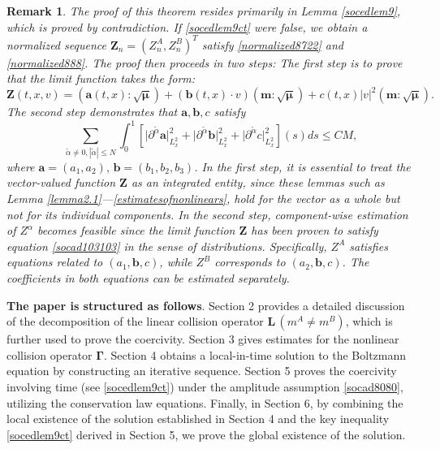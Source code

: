 \documentclass[reqno]{amsart}
\numberwithin{equation}{section}
\newtheorem{remark}[theorem]{Remark}
\numberwithin{equation}{section}
\begin{document}
\begin{remark}
	‌The proof of this theorem resides primarily in Lemma \ref{socedlem9}, which is proved by contradiction. If \eqref{socedlem9ct} were false, we obtain a  normalized sequence $\mathbf{Z}_n=(Z^A_n,Z^B_n)^T$ satisfy \eqref{normalized8722} and \eqref{normalized888}. ‌The proof then proceeds in two steps:
	‌The first step is to prove that the limit function takes the form:
	\begin{equation*}
		\mathbf{Z}(t,x,v) = (\mathbf{a}(t,x):\sqrt{\bm{\mu}}) + (\mathbf{b}(t,x) \cdot v) (\mathbf{m}:\sqrt{\bm{\mu}}) + c(t,x)|v|^2(\mathbf{m}:\sqrt{\bm{\mu}}).
	\end{equation*}
	‌The second step demonstrates that 
	$\mathbf{a},\mathbf{b},c$ satisfy 
	\begin{equation*}
	\sum_{\tilde{\alpha} \neq 0, |\tilde{\alpha}| \leq N} \int_0^1 \left[ \big|\partial^{\tilde{\alpha}} \mathbf{a}\big|_{L_x^2}^2 + \big|\partial^{\tilde{\alpha}} \mathbf{b}\big|_{L_x^2}^2 + \big|\partial^{\tilde{\alpha}} c\big|_{L_x^2}^2 \right] (s) ds \le C M,
	\end{equation*}
	where $\mathbf{a}=(a_1,a_2),\, \mathbf{b}=(b_1,b_2,b_3)$. In the first step, ‌it is essential to treat the vector-valued function $\mathbf{Z}$ as an integrated entity‌, since these lemmas such as Lemma \ref{lemma2.1}---\ref{estimatesofnonlinears}, hold for the vector as a whole but not for its individual components. In the second step, ‌component-wise estimation of $Z^{\alpha}$ becomes feasible‌ since the limit function $\mathbf{Z}$ has been proven to satisfy equation \eqref{socad103103} in the sense of distributions. Specifically, $Z^A$
	satisfies equations related to $(a_1,\mathbf{b},c)$, while $Z^B$
	corresponds to $(a_2,\mathbf{b},c)$. The coefficients in both equations can be estimated separately.
\end{remark}


	\noindent \textbf{The paper is structured as follows}.
Section 2‌ provides a detailed discussion of the decomposition of the linear collision operator ‌$\bm{L}$\,$(m^A \neq m^B)$, which is further used to prove the coercivity. ‌Section 3‌ gives estimates for the nonlinear collision operator ‌$\bm{\Gamma}$. ‌Section 4‌ obtains a local-in-time solution to the Boltzmann equation by constructing an iterative sequence. ‌Section 5 proves the coercivity involving time (see \eqref{socedlem9ct}) under the amplitude assumption \eqref{socad8080}, utilizing the conservation law equations. Finally, in ‌Section 6‌, by combining the local existence of the solution established in ‌Section 4‌ and the key inequality \eqref{socedlem9ct} derived in ‌Section 5‌, we prove the global existence of the solution.
	
\end{document}
